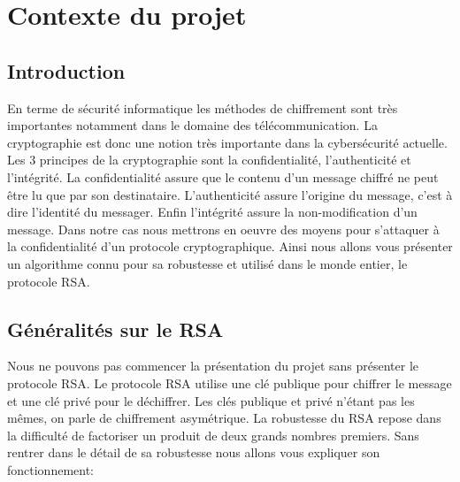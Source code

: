 \documentclass[a4paper,12pt]{article}
\begin{document}




\section{Contexte du projet}
\subsection{Introduction}
En terme de sécurité informatique les méthodes de chiffrement sont très importantes notamment dans le domaine des télécommunication. La cryptographie est donc une notion très importante dans la cybersécurité actuelle. Les 3 principes de la cryptographie sont la confidentialité, l'authenticité et l'intégrité.
La confidentialité assure que le contenu d'un message chiffré ne peut être lu que par son destinataire.
L'authenticité assure l'origine du message, c'est à dire l'identité du messager.
Enfin l'intégrité assure la non-modification d'un message.
Dans notre cas nous mettrons en oeuvre des moyens pour s'attaquer à la confidentialité d'un protocole cryptographique. 
Ainsi nous allons vous présenter un algorithme connu pour sa robustesse et utilisé dans le monde entier, le protocole RSA.
\newpage
\subsection{Généralités sur le RSA}
Nous ne pouvons pas commencer la présentation du projet sans présenter le protocole RSA.
Le protocole RSA utilise une clé publique pour chiffrer le message et une clé privé pour le déchiffrer. Les clés publique et privé n'étant pas les mêmes, on parle de chiffrement asymétrique.
La robustesse du RSA repose dans la difficulté de factoriser un produit de deux grands nombres premiers.
Sans rentrer dans le détail de sa robustesse nous allons vous expliquer son fonctionnement:
\end{document}
